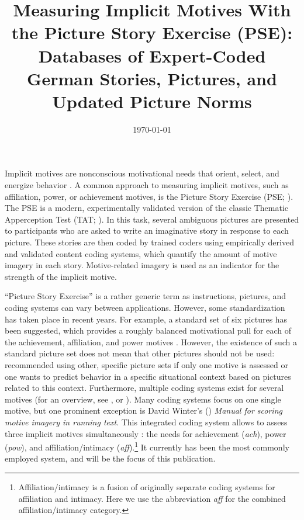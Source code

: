 \documentclass[man,a4paper,mask]{apa6}\usepackage[]{graphicx}\usepackage[]{color}
\title{Measuring Implicit Motives With the Picture Story Exercise (PSE): Databases of Expert-Coded German Stories, Pictures, and Updated Picture Norms}
\date{\today}
\begin{document}
\maketitle	%
Implicit motives are nonconscious motivational needs that orient, select, and energize behavior \parencite{mcclelland_human_1987}. A common approach to measuring implicit motives, such as affiliation, power, or achievement motives, is the Picture Story Exercise (PSE; ). The PSE is a modern, experimentally validated \parencite{mcclelland_MethodsMeasuringHuman_1958,borsboom_concept_2004} version of the classic Thematic Apperception Test (TAT; ). In this task, several ambiguous pictures are presented to participants who are asked to write an imaginative story in response to each picture. These stories are then coded by trained coders using empirically derived and validated content coding systems, which quantify the amount of motive imagery in each story. Motive-related imagery is used as an indicator for the strength of the implicit motive.

``Picture Story Exercise'' is a rather generic term as instructions, pictures, and coding systems can vary between applications. However, some standardization has taken place in recent years. For example, a standard set of six pictures has been suggested, which provides a roughly balanced motivational pull for each of the achievement, affiliation, and power motives \parencite{schultheiss_MeasuringImplicitMotives_2007}. However, the existence of such a standard picture set does not mean that other pictures should not be used: \textcite{schultheiss_MeasuringImplicitMotives_2007} recommended using other, specific picture sets if only one motive is assessed or one wants to predict behavior in a specific situational context based on pictures related to this context. Furthermore, multiple coding systems exist for several motives (for an overview, see , or ). Many coding systems focus on one single motive, but one prominent exception is David Winter's (\citeyear{winter_ManualScoringMotive_1994}) \emph{Manual for scoring motive imagery in running text}. This integrated coding system allows to assess three implicit motives simultaneously \parencite{winter_MeasuringPersonalityDistance_1991}: the needs for achievement (\emph{ach}), power (\emph{pow}), and affiliation/intimacy (\emph{aff}).\footnote{Affiliation/intimacy is a fusion of originally separate coding systems for affiliation and intimacy. Here we use the abbreviation \emph{aff} for the combined affiliation/intimacy category.} It currently has been the most commonly employed system, and will be the focus of this publication.
\end{document}
